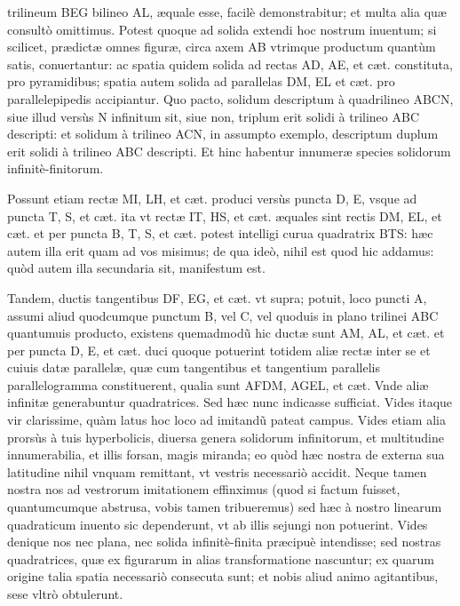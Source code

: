 \documentclass[11pt,a4paper]{article}
\begin{document}

trilineum BEG bilineo AL, æquale esse, facilè demonstrabitur; et multa alia quæ consultò omittimus. Potest quoque ad solida extendi hoc nostrum inuentum; si scilicet, prædictæ omnes figuræ, circa axem AB vtrimque productum quantùm satis, conuertantur: ac spatia quidem solida ad rectas AD, AE, et cæt. constituta, pro pyramidibus; spatia autem solida ad parallelas DM, EL et cæt. pro parallelepipedis accipiantur. Quo pacto, solidum descriptum à quadrilineo ABCN, siue illud versùs N infinitum sit, siue non, triplum erit solidi à trilineo ABC descripti: et solidum à trilineo ACN, in assumpto exemplo, descriptum duplum erit solidi à trilineo ABC descripti. Et hinc habentur innumeræ species solidorum infinitè-finitorum.

Possunt etiam rectæ MI, LH, et cæt. produci versùs puncta D, E, vsque ad puncta T, S, et cæt. ita vt rectæ IT, HS, et cæt. æquales sint rectis DM, EL, et cæt. et per puncta B, T, S, et cæt. potest intelligi curua quadratrix BTS: hæc autem illa erit quam ad vos misimus; de qua ideò, nihil est quod hic addamus: quòd autem illa secundaria sit, manifestum est.

Tandem, ductis tangentibus DF, EG, et cæt. vt supra; potuit, loco puncti A, assumi aliud quodcumque punctum B, vel C, vel quoduis in plano trilinei ABC quantumuis producto, existens  quemadmodũ hic ductæ sunt AM, AL, et cæt. et per puncta D, E, et cæt. duci quoque potuerint totidem aliæ rectæ inter se et cuiuis datæ parallelæ, quæ cum tangentibus et tangentium parallelis parallelogramma constituerent, qualia sunt AFDM, AGEL, et cæt. Vnde aliæ infinitæ generabuntur quadratrices. Sed hæc nunc indicasse sufficiat. Vides itaque vir clarissime, quàm latus hoc loco ad imitandũ pateat campus. Vides etiam alia prorsùs à tuis hyperbolicis, diuersa genera solidorum infinitorum, et multitudine innumerabilia, et illis forsan, magis miranda; eo quòd hæc nostra de externa sua latitudine nihil vnquam remittant, vt vestris necessariò accidit. Neque tamen nostra nos ad vestrorum imitationem effinximus (quod si factum fuisset, quantumcumque abstrusa, vobis tamen tribueremus) sed hæc à nostro linearum quadraticum inuento sic dependerunt, vt ab illis sejungi non potuerint. Vides denique nos nec plana, nec solida infinitè-finita præcipuè intendisse; sed nostras quadratrices, quæ ex figurarum in alias transformatione nascuntur; ex quarum origine talia spatia necessariò consecuta sunt; et nobis aliud animo agitantibus, sese vltrò obtulerunt.
\end{document}
